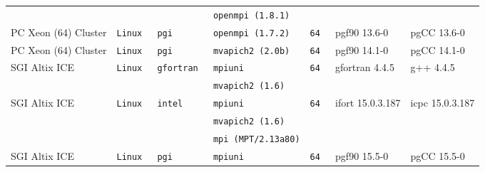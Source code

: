 \begin{longtable}{lllllll}
                      &           &                 &\tt openmpi (1.8.1)  &                 &                                     &                                 \\
PC Xeon (64) Cluster  &\tt Linux  &\tt pgi          &\tt openmpi (1.7.2)  &\tt 64           & pgf90 \footnotesize 13.6-0          & pgCC \footnotesize 13.6-0       \\ %
PC Xeon (64) Cluster  &\tt Linux  &\tt pgi          &\tt mvapich2 (2.0b)  &\tt 64           & pgf90 \footnotesize 14.1-0          & pgCC \footnotesize 14.1-0       \\ %
SGI Altix ICE         &\tt Linux  &\tt gfortran     &\tt mpiuni           &\tt 64           & gfortran \footnotesize 4.4.5        & g++ \footnotesize 4.4.5         \\ %
                      &           &                 &\tt mvapich2 (1.6)   &                 &                                     &                                 \\
SGI Altix ICE         &\tt Linux  &\tt intel        &\tt mpiuni           &\tt 64           & ifort \footnotesize 15.0.3.187      & icpc \footnotesize 15.0.3.187   \\ %
                      &           &                 &\tt mvapich2 (1.6)   &                 &                                     &                                 \\
                      &           &                 &\tt mpi (MPT/2.13a80)&                 &                                     &                                 \\
SGI Altix ICE         &\tt Linux  &\tt pgi          &\tt mpiuni           &\tt 64           & pgf90 \footnotesize 15.5-0          & pgCC \footnotesize 15.5-0       \\ %

\end{longtable}
